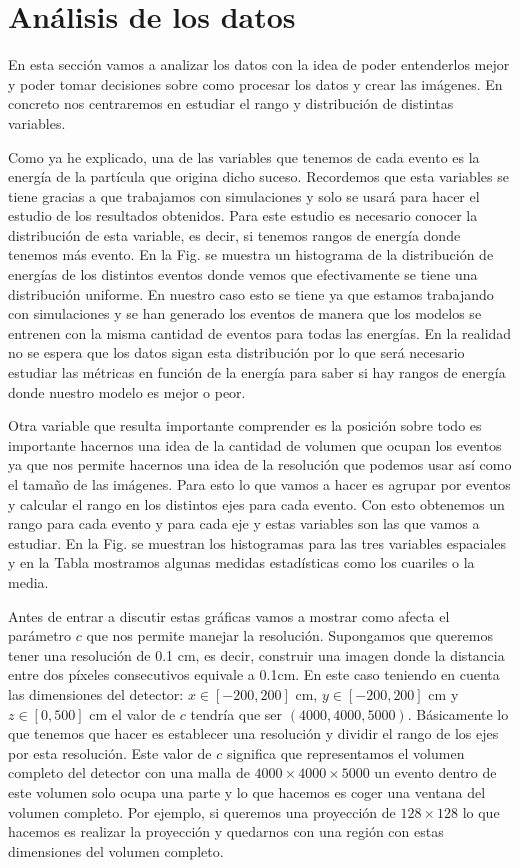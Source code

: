 \documentclass[a4paper,12pt,twoside,titlepage]{article}
\begin{document}
\section{Análisis de los datos}
En esta sección vamos a analizar los datos con la idea de poder entenderlos mejor y poder tomar decisiones sobre como procesar los datos y crear las imágenes. En concreto nos centraremos en estudiar el rango y distribución de distintas variables.

Como ya he explicado, una de las variables que tenemos de cada evento es la energía de la partícula que origina dicho suceso. Recordemos que esta variables se tiene gracias a que trabajamos con simulaciones y solo se usará para hacer el estudio de los resultados obtenidos. Para este estudio es necesario conocer la distribución de esta variable, es decir, si tenemos rangos de energía donde tenemos más evento. En la Fig. se muestra un histograma de la distribución de energías de los distintos eventos donde vemos que efectivamente se tiene una distribución uniforme. En nuestro caso esto se tiene ya que estamos trabajando con simulaciones y se han generado los eventos de manera que los modelos se entrenen con la misma cantidad de eventos para todas las energías. En la realidad no se espera que los datos sigan esta distribución por lo que será necesario estudiar las métricas en función de la energía para saber si hay rangos de energía donde nuestro modelo es mejor o peor.

Otra variable que resulta importante comprender es la posición sobre todo es importante hacernos una idea de la cantidad de volumen que ocupan los eventos ya que nos permite hacernos una idea de la resolución que podemos usar así como el tamaño de las imágenes. Para esto lo que vamos a hacer es agrupar por eventos y calcular el rango en los distintos ejes para cada evento. Con esto obtenemos un rango para cada evento y para cada eje y estas variables son las que vamos a estudiar. En la Fig. se muestran los histogramas para las tres variables espaciales y en la Tabla mostramos algunas medidas estadísticas como los cuariles o la media.

Antes de entrar a discutir estas gráficas vamos a mostrar como afecta el parámetro $c$ que nos permite manejar la resolución. Supongamos que queremos tener una resolución de 0.1 cm, es decir, construir una imagen donde la distancia entre dos píxeles consecutivos equivale a 0.1cm. En este caso teniendo en cuenta las dimensiones del detector: $x \in [-200, 200]$ cm, $y \in [-200, 200]$ cm y $z \in [0, 500]$ cm el valor de $c$ tendría que ser $(4000, 4000, 5000)$. Básicamente lo que tenemos que hacer es establecer una resolución y dividir el rango de los ejes por esta resolución. Este valor de $c$ significa que representamos el volumen completo del detector con una malla de $4000\times 4000\times 5000$ un evento dentro de este volumen solo ocupa una parte y lo que hacemos es coger una ventana del volumen completo. Por ejemplo, si queremos una proyección de $128\times 128$ lo que hacemos es realizar la proyección y quedarnos con una región con estas dimensiones del volumen completo.
\end{document}
